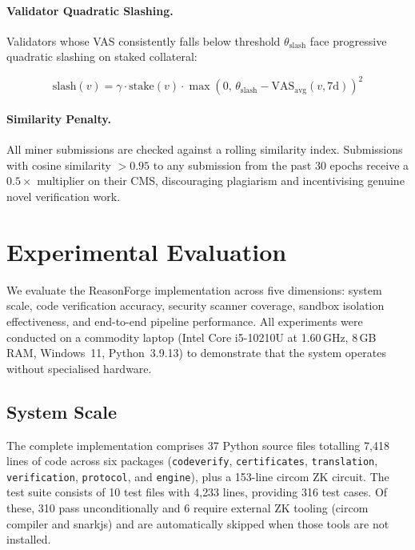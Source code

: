 \documentclass[11pt,a4paper]{article}
\begin{document}
\paragraph{Validator Quadratic Slashing.}
Validators whose VAS consistently falls below threshold
$\theta_{\text{slash}}$ face progressive quadratic slashing on staked
collateral:

\begin{equation}
  \text{slash}(v) = \gamma \cdot \text{stake}(v)
    \cdot \max\!\left(0,\,
    \theta_{\text{slash}} - \text{VAS}_{\text{avg}}(v, 7\text{d})
    \right)^{2}
  \label{eq:slash}
\end{equation}

\paragraph{Similarity Penalty.}
All miner submissions are checked against a rolling similarity index.
Submissions with cosine similarity $> 0.95$ to any submission from the
past 30 epochs receive a $0.5\times$ multiplier on their CMS,
discouraging plagiarism and incentivising genuine novel verification work.

\section{Experimental Evaluation}
\label{sec:evaluation}

We evaluate the ReasonForge implementation across five dimensions:
system scale, code verification accuracy, security scanner coverage,
sandbox isolation effectiveness, and end-to-end pipeline performance.
All experiments were conducted on a commodity laptop (Intel Core
i5-10210U at 1.60\,GHz, 8\,GB RAM, Windows~11, Python~3.9.13) to
demonstrate that the system operates without specialised hardware.

\subsection{System Scale}

The complete implementation comprises 37 Python source files totalling
7{,}418 lines of code across six packages (\texttt{codeverify},
\texttt{certificates}, \texttt{translation}, \texttt{verification},
\texttt{protocol}, and \texttt{engine}), plus a 153-line circom ZK
circuit.  The test suite consists of 10 test files with 4{,}233 lines,
providing 316 test cases.  Of these, 310 pass unconditionally and 6
require external ZK tooling (circom compiler and snarkjs) and are
automatically skipped when those tools are not installed.
\end{document}
